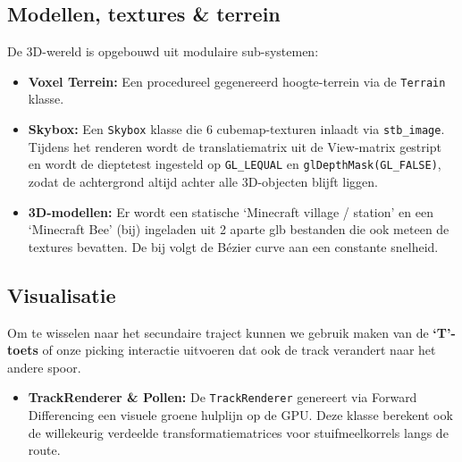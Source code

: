 \documentclass[11pt,a4paper]{article}
\begin{document}
\subsection{Modellen, textures \& terrein}
De 3D-wereld is opgebouwd uit modulaire sub-systemen:
\begin{itemize}
	\item \textbf{Voxel Terrein:} Een procedureel gegenereerd hoogte-terrein via de \texttt{Terrain} klasse. 
	\item \textbf{Skybox:} Een \texttt{Skybox} klasse die 6 cubemap-texturen inlaadt via \texttt{stb\_image}. Tijdens het renderen wordt de translatiematrix uit de View-matrix gestript en wordt de dieptetest ingesteld op \texttt{GL\_LEQUAL} en \texttt{glDepthMask(GL\_FALSE)}, zodat de achtergrond altijd achter alle 3D-objecten blijft liggen.
	\item \textbf{3D-modellen:} Er wordt een statische `Minecraft village / station' en een `Minecraft Bee' (bij) ingeladen uit 2 aparte glb bestanden die ook meteen de textures bevatten. De bij volgt de Bézier curve aan een constante snelheid.
\end{itemize}	

\subsection{Visualisatie}
Om te wisselen naar het secundaire traject kunnen we gebruik maken van de \textbf{`T'-toets} of onze picking interactie uitvoeren dat ook de track verandert naar het andere spoor.

\begin{itemize}
	\item \textbf{TrackRenderer \& Pollen:} De \texttt{TrackRenderer} genereert via Forward Differencing een visuele groene hulplijn op de GPU. Deze klasse berekent ook de willekeurig verdeelde transformatiematrices voor stuifmeelkorrels langs de route. 
\end{itemize}
\end{document}
